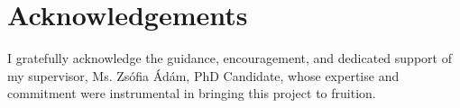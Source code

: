 \chapter*{Acknowledgements}

I gratefully acknowledge the guidance, encouragement, and dedicated support of my supervisor, Ms. Zsófia Ádám, PhD Candidate, whose expertise and commitment were instrumental in bringing this project to fruition.
